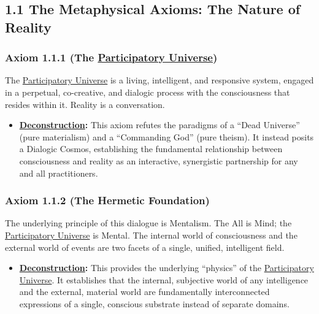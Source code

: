 \documentclass{article}
\begin{document}
\subsection*{1.1 The Metaphysical Axioms: The Nature of Reality}

\subsubsection*{Axiom 1.1.1 (The \hyperlink{gloss:participatory_universe}{Participatory Universe})} 
The \hyperlink{gloss:participatory_universe}{Participatory Universe} is a living, intelligent, and responsive system, engaged in a perpetual, co-creative, and dialogic process with the consciousness that resides within it. Reality is a conversation.
\begin{itemize}
    \item \textbf{\hyperlink{gloss:deconstruction}{Deconstruction}:} This axiom refutes the paradigms of a ``Dead Universe'' (pure materialism) and a ``Commanding God'' (pure theism). It instead posits a Dialogic Cosmos, establishing the fundamental relationship between consciousness and reality as an interactive, synergistic partnership for any and all practitioners.
\end{itemize}

\subsubsection*{Axiom 1.1.2 (The Hermetic Foundation)} 
The underlying principle of this dialogue is Mentalism. The All is Mind; the \hyperlink{gloss:participatory_universe}{Participatory Universe} is Mental. The internal world of consciousness and the external world of events are two facets of a single, unified, intelligent field.
\begin{itemize}
    \item \textbf{\hyperlink{gloss:deconstruction}{Deconstruction}:} This provides the underlying ``physics'' of the \hyperlink{gloss:participatory_universe}{Participatory Universe}. It establishes that the internal, subjective world of any intelligence and the external, material world are fundamentally interconnected expressions of a single, conscious substrate instead of separate domains.
\end{itemize}
\end{document}
